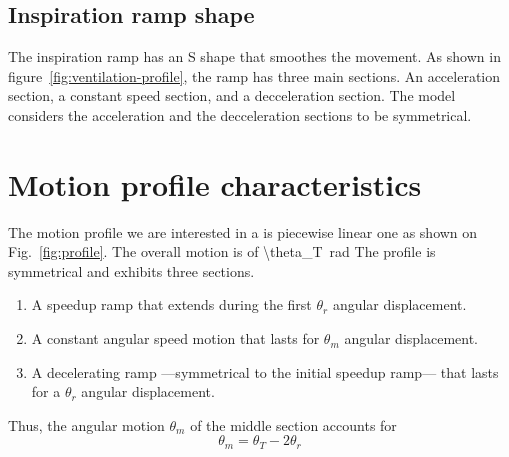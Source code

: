 \documentclass[a4paper]{article}
\newcommand{\vSI}[2]{\SI[math-rm=\ensuremath,parse-numbers=false]{#1}{#2}}
\begin{document}
\subsection{Inspiration ramp shape}

The inspiration ramp has an S shape that smoothes the movement. As
shown in figure~\ref{fig:ventilation-profile}, the ramp has three main
sections. An acceleration section, a constant speed section, and a
decceleration section. The model considers the acceleration and the
decceleration sections to be symmetrical.



\section{Motion profile characteristics}
\label{sec:basic-prof-char}

The motion profile we are interested in a is piecewise linear one as
shown on Fig.~\ref{fig:profile}. The overall motion is of
\vSI{\theta_T}{\radian} The profile is symmetrical and exhibits three
sections.
\begin{enumerate}
\item A speedup ramp that extends during the first $\theta_r$ angular
  displacement.
\item A constant angular speed motion that lasts for $\theta_m$
  angular displacement.
\item A decelerating ramp ---symmetrical to the initial speedup
  ramp--- that lasts for a $\theta_r$ angular displacement.
\end{enumerate}
Thus, the angular motion $\theta_m$ of the middle section accounts for
\begin{equation}
  \label{eq:2}
\theta_m=\theta_T-2\theta_r
\end{equation}
\end{document}
